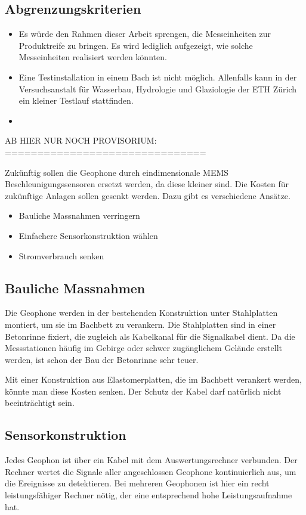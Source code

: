 \subsection{Abgrenzungskriterien}
\begin{itemize}
\item Es würde den Rahmen dieser Arbeit sprengen, die Messeinheiten zur Produktreife zu bringen. Es wird lediglich aufgezeigt, wie solche Messeinheiten realisiert werden könnten.
\item Eine Testinstallation in einem Bach ist nicht möglich. Allenfalls kann in der Versuchsanstalt für Wasserbau, Hydrologie und Glaziologie der ETH Zürich ein kleiner Testlauf stattfinden.
\item
\end{itemize}

AB HIER NUR NOCH PROVISORIUM:
===============================

Zukünftig sollen die Geophone durch eindimensionale MEMS Beschleunigungssensoren ersetzt werden, da diese kleiner sind.
Die Kosten für zukünftige Anlagen sollen gesenkt werden. Dazu gibt es verschiedene Ansätze.
\begin{itemize}
\item Bauliche Massnahmen verringern
\item Einfachere Sensorkonstruktion wählen
\item Stromverbrauch senken
\end{itemize}

\subsection{Bauliche Massnahmen}
Die Geophone werden in der bestehenden Konstruktion unter Stahlplatten montiert, um sie im Bachbett zu verankern. Die Stahlplatten sind in einer Betonrinne fixiert, die zugleich als Kabelkanal für die Signalkabel dient. Da die Messstationen häufig im Gebirge oder schwer zugänglichem Gelände erstellt werden, ist schon der Bau der Betonrinne sehr teuer.

Mit einer Konstruktion aus Elastomerplatten, die im Bachbett verankert werden, könnte man diese Kosten senken. Der Schutz der Kabel darf natürlich nicht beeinträchtigt sein.

\subsection{Sensorkonstruktion}
Jedes Geophon ist über ein Kabel mit dem Auswertungsrechner verbunden. Der Rechner wertet die Signale aller angeschlossen Geophone kontinuierlich aus, um die Ereignisse zu detektieren. Bei mehreren Geophonen ist hier ein recht leistungsfähiger Rechner nötig, der eine entsprechend hohe Leistungsaufnahme hat. 

